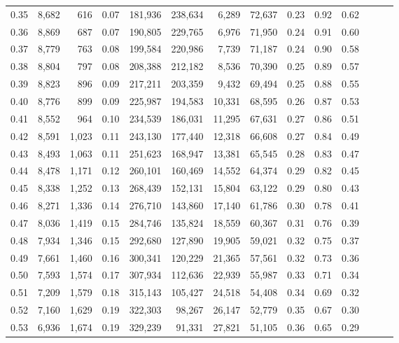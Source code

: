 \begin{tabular}{rrrrrrrrrrrrrr}
0.35 &  8,682 &    616 &  0.07 &  181,936 &  238,634 &   6,289 &  72,637 &  0.23 &  0.92 &      0.62 \\
0.36 &  8,869 &    687 &  0.07 &  190,805 &  229,765 &   6,976 &  71,950 &  0.24 &  0.91 &      0.60 \\
0.37 &  8,779 &    763 &  0.08 &  199,584 &  220,986 &   7,739 &  71,187 &  0.24 &  0.90 &      0.58 \\
0.38 &  8,804 &    797 &  0.08 &  208,388 &  212,182 &   8,536 &  70,390 &  0.25 &  0.89 &      0.57 \\
0.39 &  8,823 &    896 &  0.09 &  217,211 &  203,359 &   9,432 &  69,494 &  0.25 &  0.88 &      0.55 \\
0.40 &  8,776 &    899 &  0.09 &  225,987 &  194,583 &  10,331 &  68,595 &  0.26 &  0.87 &      0.53 \\
0.41 &  8,552 &    964 &  0.10 &  234,539 &  186,031 &  11,295 &  67,631 &  0.27 &  0.86 &      0.51 \\
0.42 &  8,591 &  1,023 &  0.11 &  243,130 &  177,440 &  12,318 &  66,608 &  0.27 &  0.84 &      0.49 \\
0.43 &  8,493 &  1,063 &  0.11 &  251,623 &  168,947 &  13,381 &  65,545 &  0.28 &  0.83 &      0.47 \\
0.44 &  8,478 &  1,171 &  0.12 &  260,101 &  160,469 &  14,552 &  64,374 &  0.29 &  0.82 &      0.45 \\
0.45 &  8,338 &  1,252 &  0.13 &  268,439 &  152,131 &  15,804 &  63,122 &  0.29 &  0.80 &      0.43 \\
0.46 &  8,271 &  1,336 &  0.14 &  276,710 &  143,860 &  17,140 &  61,786 &  0.30 &  0.78 &      0.41 \\
0.47 &  8,036 &  1,419 &  0.15 &  284,746 &  135,824 &  18,559 &  60,367 &  0.31 &  0.76 &      0.39 \\
0.48 &  7,934 &  1,346 &  0.15 &  292,680 &  127,890 &  19,905 &  59,021 &  0.32 &  0.75 &      0.37 \\
0.49 &  7,661 &  1,460 &  0.16 &  300,341 &  120,229 &  21,365 &  57,561 &  0.32 &  0.73 &      0.36 \\
0.50 &  7,593 &  1,574 &  0.17 &  307,934 &  112,636 &  22,939 &  55,987 &  0.33 &  0.71 &      0.34 \\
0.51 &  7,209 &  1,579 &  0.18 &  315,143 &  105,427 &  24,518 &  54,408 &  0.34 &  0.69 &      0.32 \\
0.52 &  7,160 &  1,629 &  0.19 &  322,303 &   98,267 &  26,147 &  52,779 &  0.35 &  0.67 &      0.30 \\
0.53 &  6,936 &  1,674 &  0.19 &  329,239 &   91,331 &  27,821 &  51,105 &  0.36 &  0.65 &      0.29 \\

\end{tabular}
